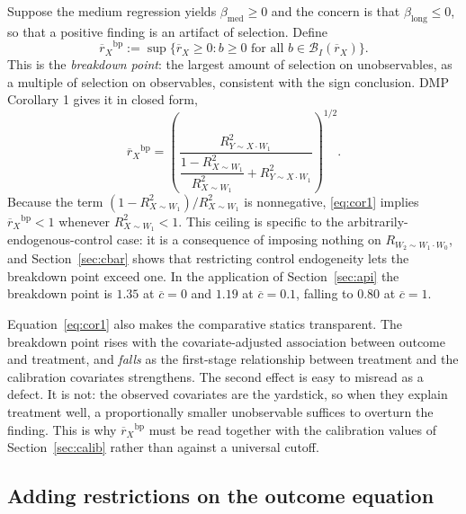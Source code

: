 \documentclass[article]{jss}\usepackage[]{graphicx}\usepackage[]{xcolor}
\newcommand{\blong}{\beta_{\mathrm{long}}}
\newcommand{\bmed}{\beta_{\mathrm{med}}}
\newcommand{\rxbar}{\ensuremath{\overline{r}_X}}
\newcommand{\cbar}{\ensuremath{\overline{c}}}
\newcommand{\Rsq}[1]{\ensuremath{R^2_{#1}}}
\begin{document}
Suppose the medium regression yields $\bmed \ge 0$ and the concern is that
$\blong \le 0$, so that a positive finding is an artifact of selection.
Define
\begin{equation}
\rxbar^{\mathrm{bp}}
:= \sup\{\rxbar \ge 0 : b \ge 0 \text{ for all } b \in
         \mathcal{B}_I(\rxbar)\}.
\label{eq:bpdef}
\end{equation}
This is the \emph{breakdown point}: the largest amount of selection on
unobservables, as a multiple of selection on observables, consistent with
the sign conclusion. DMP Corollary 1 gives it in closed form,
\begin{equation}
\rxbar^{\mathrm{bp}}
= \left(\frac{\Rsq{Y \sim X \cdot W_1}}
             {\dfrac{1 - \Rsq{X \sim W_1}}{\Rsq{X \sim W_1}}
              + \Rsq{Y \sim X \cdot W_1}}\right)^{1/2}.
\label{eq:cor1}
\end{equation}
Because the term $(1 - \Rsq{X \sim W_1}) / \Rsq{X \sim W_1}$ is
nonnegative, \eqref{eq:cor1} implies
$\rxbar^{\mathrm{bp}} < 1$ whenever $\Rsq{X \sim W_1} < 1$. This ceiling is
specific to the arbitrarily-endogenous-control case: it is a consequence of
imposing nothing on $R_{W_2 \sim W_1 \cdot W_0}$, and
Section~\ref{sec:cbar} shows that restricting control endogeneity lets the
breakdown point exceed one. In the application of
Section~\ref{sec:api} the breakdown point is $1.35$ at $\cbar = 0$ and
$1.19$ at $\cbar = 0.1$, falling to $0.80$ at $\cbar = 1$.

Equation~\eqref{eq:cor1} also makes the comparative statics transparent.
The breakdown point rises with the covariate-adjusted association between
outcome and treatment, and \emph{falls} as the first-stage relationship
between treatment and the calibration covariates strengthens. The second
effect is easy to misread as a defect. It is not: the observed covariates
are the yardstick, so when they explain treatment well, a proportionally
smaller unobservable suffices to overturn the finding. This is why
$\rxbar^{\mathrm{bp}}$ must be read together with the calibration values of
Section~\ref{sec:calib} rather than against a universal cutoff.

\subsection{Adding restrictions on the outcome equation}\label{sec:rybar}
\end{document}
